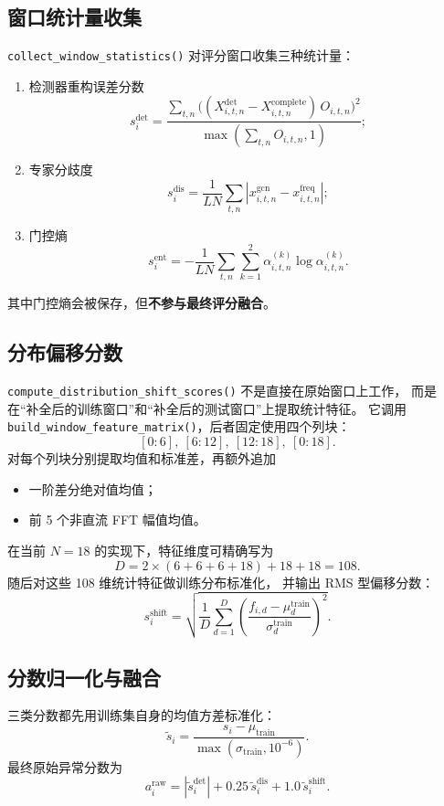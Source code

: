 \documentclass[UTF8,11pt,a4paper]{ctexart}
\begin{document}
\subsection{窗口统计量收集}

\texttt{collect\_window\_statistics()} 对评分窗口收集三种统计量：
\begin{enumerate}
  \item 检测器重构误差分数
  \[
  s^{\mathrm{det}}_i
  =
  \frac{\sum_{t,n}
  \big((X^{\mathrm{det}}_{i,t,n}-X^{\mathrm{complete}}_{i,t,n})\,O_{i,t,n}\big)^2}
  {\max(\sum_{t,n}O_{i,t,n},1)};
  \]
  \item 专家分歧度
  \[
  s^{\mathrm{dis}}_i
  =
  \frac{1}{LN}\sum_{t,n}|x^{\mathrm{gcn}}_{i,t,n}-x^{\mathrm{freq}}_{i,t,n}|;
  \]
  \item 门控熵
  \[
  s^{\mathrm{ent}}_i
  =
  -\frac{1}{LN}\sum_{t,n}\sum_{k=1}^{2}\alpha^{(k)}_{i,t,n}\log\alpha^{(k)}_{i,t,n}.
  \]
\end{enumerate}

其中门控熵会被保存，但\textbf{不参与最终评分融合}。

\subsection{分布偏移分数}

\texttt{compute\_distribution\_shift\_scores()} 不是直接在原始窗口上工作，
而是在“补全后的训练窗口”和“补全后的测试窗口”上提取统计特征。
它调用 \texttt{build\_window\_feature\_matrix()}，后者固定使用四个列块：
\[
[0{:}6],\ [6{:}12],\ [12{:}18],\ [0{:}18].
\]
对每个列块分别提取均值和标准差，再额外追加
\begin{itemize}
  \item 一阶差分绝对值均值；
  \item 前 5 个非直流 FFT 幅值均值。
\end{itemize}

在当前 $N=18$ 的实现下，特征维度可精确写为
\[
D=2\times (6+6+6+18)+18+18=108.
\]
随后对这些 108 维统计特征做训练分布标准化，
并输出 RMS 型偏移分数：
\[
s^{\mathrm{shift}}_i=
\sqrt{\frac{1}{D}\sum_{d=1}^{D}
\left(\frac{f_{i,d}-\mu^{\mathrm{train}}_d}{\sigma^{\mathrm{train}}_d}\right)^2 }.
\]

\subsection{分数归一化与融合}

三类分数都先用训练集自身的均值方差标准化：
\[
\tilde{s}_i=
\frac{s_i-\mu_{\mathrm{train}}}{\max(\sigma_{\mathrm{train}},10^{-6})}.
\]
最终原始异常分数为
\[
a^{\mathrm{raw}}_i=
|\tilde{s}^{\mathrm{det}}_i|
+
0.25\,\tilde{s}^{\mathrm{dis}}_i
+
1.0\,\tilde{s}^{\mathrm{shift}}_i.
\]
\end{document}
